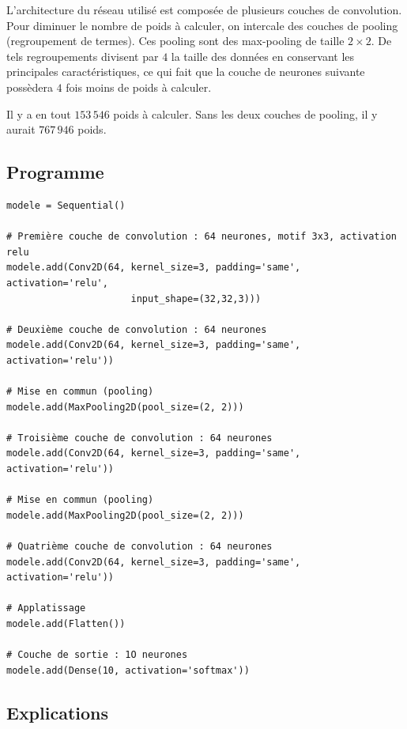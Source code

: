 \documentclass[11pt,class=report,crop=false]{standalone}
\begin{document}
L'architecture du réseau utilisé est composée de plusieurs couches de convolution.
Pour diminuer le nombre de poids à calculer, on intercale des couches de pooling (regroupement de termes). Ces pooling sont des max-pooling de taille $2 \times 2$.
De tels regroupements divisent par $4$ la taille des données en conservant les principales caractéristiques, ce qui fait que la couche de neurones suivante possèdera $4$ fois moins de poids à calculer.
 
 
 
Il y a en tout $153\,546$ poids à calculer. 
Sans les deux couches de pooling, il y aurait $767\,946$ poids.

\subsection{Programme}

\begin{lstlisting}
modele = Sequential()

# Première couche de convolution : 64 neurones, motif 3x3, activation relu
modele.add(Conv2D(64, kernel_size=3, padding='same', activation='relu',
                      input_shape=(32,32,3)))

# Deuxième couche de convolution : 64 neurones
modele.add(Conv2D(64, kernel_size=3, padding='same', activation='relu'))

# Mise en commun (pooling)
modele.add(MaxPooling2D(pool_size=(2, 2)))

# Troisième couche de convolution : 64 neurones
modele.add(Conv2D(64, kernel_size=3, padding='same', activation='relu'))

# Mise en commun (pooling)
modele.add(MaxPooling2D(pool_size=(2, 2)))

# Quatrième couche de convolution : 64 neurones
modele.add(Conv2D(64, kernel_size=3, padding='same', activation='relu'))

# Applatissage 
modele.add(Flatten())

# Couche de sortie : 1O neurones
modele.add(Dense(10, activation='softmax'))
\end{lstlisting}

\subsection{Explications}
\end{document}
